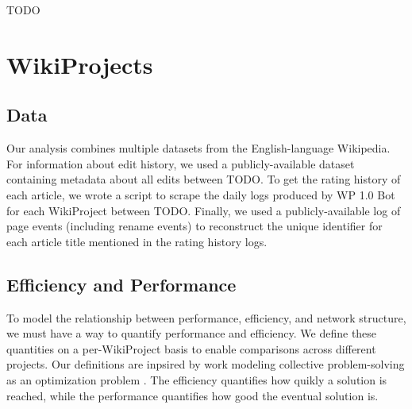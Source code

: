 \documentclass[10pt,twocolumn]{article}
\newcommand{\+}{\phantom{-}}
\begin{document}
TODO

\section{WikiProjects}

\subsection{Data}

Our analysis combines multiple datasets from the English-language Wikipedia.
For information about edit history, we used a publicly-available dataset containing
metadata about all edits between TODO.
To get the rating history of each article,
we wrote a script to scrape the daily logs produced by WP 1.0 Bot for each WikiProject
between TODO.
Finally, we used a publicly-available log of page events (including rename events)
to reconstruct the unique identifier for each article title mentioned in the rating history logs.

\subsection{Efficiency and Performance}

To model the relationship between performance, efficiency, and network structure,
we must have a way to quantify performance and efficiency.
We define these quantities on a per-WikiProject basis to enable comparisons across different
projects.
Our definitions are inpsired by work modeling collective problem-solving as an optimization
problem \cite{lazer_network_2007, mason_propagation_2008, mason_collaborative_2012,
grim_scientific_2013, barkoczi_social_2016}.
The efficiency quantifies how quikly a solution is reached,
while the performance quantifies how good the eventual solution is.
\end{document}
